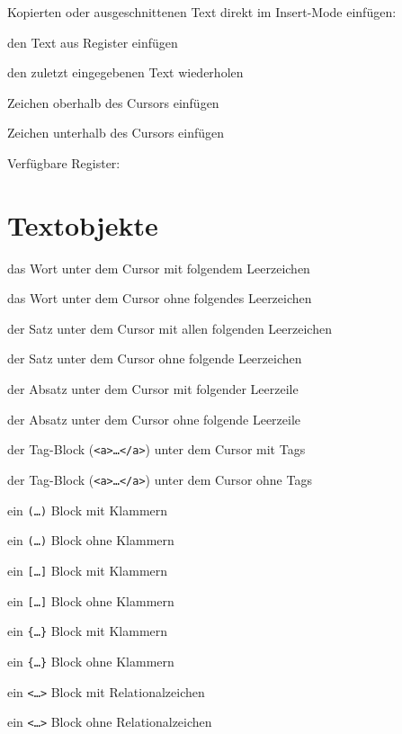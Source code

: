 \documentclass
[
  draft    = true,
  fontsize = 11pt,
  parskip  = half,
  BCOR     = 0pt,
  DIV      = calc,
  ngerman
]
{scrartcl}
\begin{document}
Kopierten oder ausgeschnittenen Text direkt im Insert-Mode einfügen:
\begin{mytemize}
  \item {} den Text aus Register  einfügen
  \item {}  den zuletzt eingegebenen Text wiederholen
  \item {}  Zeichen oberhalb des Cursors einfügen
  \item {}  Zeichen unterhalb des Cursors einfügen
\end{mytemize}

Verfügbare Register:


\section{Textobjekte}
\begin{mytemize}
  \item {}  das Wort unter dem Cursor mit folgendem Leerzeichen
  \item {}  das Wort unter dem Cursor ohne folgendes Leerzeichen
  \item {}  der Satz unter dem Cursor mit allen folgenden Leerzeichen
  \item {}  der Satz unter dem Cursor ohne folgende Leerzeichen
  \item {}  der Absatz unter dem Cursor mit folgender Leerzeile
  \item {}  der Absatz unter dem Cursor ohne folgende Leerzeile
  \item {}  der Tag-Block (\texttt{<a>\ldots</a>}) unter dem Cursor mit Tags
  \item {}  der Tag-Block (\texttt{<a>\ldots</a>}) unter dem Cursor ohne Tags
  \item {}  ein \texttt{(\ldots)} Block mit Klammern
  \item {}  ein \texttt{(\ldots)} Block ohne Klammern
  \item \vimcmd{}{a]}{}  ein \texttt{[\ldots]} Block mit Klammern
  \item \vimcmd{}{i]}{}  ein \texttt{[\ldots]} Block ohne Klammern
  \item {} ein \texttt{\{\ldots\}} Block mit Klammern
  \item {} ein \texttt{\{\ldots\}} Block ohne Klammern
  \item {}  ein \texttt{<\ldots>} Block mit Relationalzeichen
  \item {}  ein \texttt{<\ldots>} Block ohne Relationalzeichen
\end{mytemize}
\end{document}
